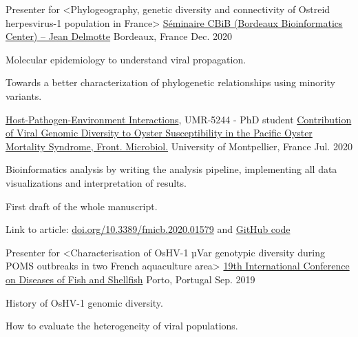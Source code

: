 \begin{cventries}
  \cventry
    {Presenter for <Phylogeography, genetic diversity and connectivity of Ostreid herpesvirus-1 population in France>} %
    {\href{https://www.bordeaux-neurocampus.fr/en/event/seminaire-cbib-jean-delmotte/}{Séminaire CBiB (Bordeaux Bioinformatics Center) – Jean Delmotte}} %
    {Bordeaux, France} %
    {Dec. 2020} %
    {
      \begin{cvitems} %
        \item {Molecular epidemiology to understand viral propagation.}
        \item {Towards a better characterization of phylogenetic relationships using minority variants.}
      \end{cvitems}
    }


  \cventry
    {\href{http://ihpe.univ-perp.fr/}{Host-Pathogen-Environment Interactions}, UMR-5244 - PhD student} %
    {\href{https://doi.org/10.3389/fmicb.2020.01579}{Contribution of Viral Genomic Diversity to Oyster Susceptibility in the Pacific Oyster Mortality Syndrome, Front. Microbiol.}} %
    {University of Montpellier, France} %
    {Jul. 2020} %
    {
      \begin{cvitems} %
        \item {Bioinformatics analysis by writing the analysis pipeline, implementing all data visualizations and interpretation of results.}
        \item {First draft of the whole manuscript.}
        \item Link to article:  {\href{https://doi.org/10.3389/fmicb.2020.01579}{doi.org/10.3389/fmicb.2020.01579} and  \href{https://github.com/propan2one/DivOsHV-1}{GitHub code}}
      \end{cvitems}
    }

  \cventry
    {Presenter for <Characterisation of OsHV-1 µVar genotypic diversity during POMS outbreaks in two French aquaculture area>} %
    {\href{https://eafp.org/19-eafp-porto-2019/}{19th International Conference on Diseases of Fish and Shellfish}} %
    {Porto, Portugal} %
    {Sep. 2019} %
    {
      \begin{cvitems} %
        \item {History of OsHV-1 genomic diversity.}
        \item {How to evaluate the heterogeneity of viral populations.}
      \end{cvitems}
    }


\end{cventries}
